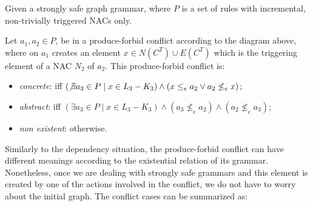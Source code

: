 \begin{definition} Given \doublyTypedGraphGrammarCore{} a strongly safe graph grammar, where $P$ is a set of rules with incremental, non-trivially triggered NACs only.

\hfill

  Let $a_1,a_2 \in P$, be in a produce-forbid conflict according to the diagram above, where on $a_1$ creates an element $x \in N(C^T) \cup E(C^T)$ which is the triggering element of a NAC $N_2$ of $a_2$. This produce-forbid conflict is:

\begin{itemize}
  \item \emph{concrete}: iff $(\not\exists a_3 \in P \mid x \in L_3 - K_3) \land (x \leq_e a_2 \lor a_2 \not\leq_e x)$; %
  \item \emph{abstract}: iff $(\exists a_3 \in P \mid x \in L_3 - K_3) \land (a_3 \not\leq_e a_2) \land (a_2 \not\leq_e a_3)$;
  \item \emph{non existent}: otherwise.
\end{itemize}

\end{definition}

  Similarly to the dependency situation, the produce-forbid conflict can have different meanings according to the existential relation of its grammar. Nonetheless, once we are dealing with strongly safe grammars and this element is created by one of the actions involved in the conflict, we do not have to worry about the initial graph. The conflict cases can be summarized as:


